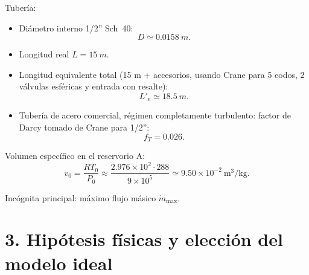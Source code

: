 \documentclass[11pt,a4paper]{article}
\begin{document}
Tubería:
\begin{itemize}
  \item Diámetro interno 1/2'' Sch~40:
  \[
  D \simeq \SI{0.0158}{m}.
  \]
  \item Longitud real $L = \SI{15}{m}$.
  \item Longitud equivalente total (15 m + accesorios, usando Crane para 5 codos, 2 válvulas esféricas y entrada con resalte):
  \[
  L'_e \simeq \SI{18.5}{m}.
  \]
  \item Tubería de acero comercial, régimen completamente turbulento: factor de Darcy tomado de Crane para 1/2'':
  \[
  f_T = 0.026.
  \]
\end{itemize}

Volumen específico en el reservorio A:
\[
v_0 = \frac{R T_0}{P_0}
      \approx \frac{2.976\times10^{2} \cdot 288}{9\times10^5}
      \simeq 9.50\times10^{-2}\ \text{m}^3/\text{kg}.
\]

Incógnita principal: máximo flujo másico $\dot m_{\max}$.

\section*{3. Hipótesis físicas y elección del modelo ideal}
\end{document}
